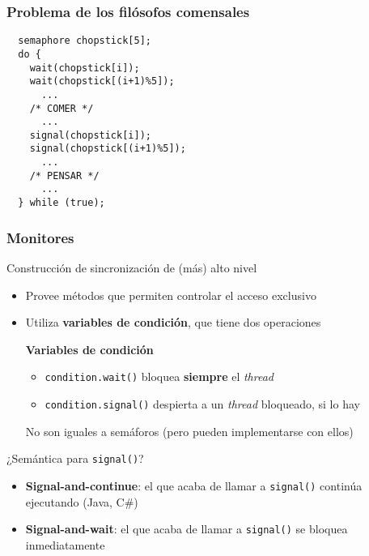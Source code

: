 \documentclass[letter]{beamer}
\begin{document}
\begin{frame}[fragile]
  \frametitle{Problema de los filósofos comensales}


\begin{verbatim}
  semaphore chopstick[5];
  do {
    wait(chopstick[i]);
    wait(chopstick[(i+1)%5]);
      ...
    /* COMER */
      ... 
    signal(chopstick[i]);
    signal(chopstick[(i+1)%5]);
      ...
    /* PENSAR */
      ...
  } while (true);
\end{verbatim}

\end{frame}

\begin{frame}
  \frametitle{Monitores}

  Construcción de sincronización de (más) alto nivel
  
  \begin{itemize}
    \item Provee métodos que permiten controlar el acceso exclusivo
    \item Utiliza {\bf variables de condición}, que tiene dos operaciones
      \begin{exampleblock}{{\bf Variables de condición}}
        \begin{itemize}
          \item {\tt condition.wait()} bloquea {\bf siempre} el {\em thread}
          \item {\tt condition.signal()} despierta a un {\em thread} bloqueado, si lo hay
        \end{itemize}
        No son iguales a semáforos (pero pueden implementarse con ellos)
      \end{exampleblock}
  \end{itemize}

  ¿Semántica para {\tt signal()}?
  \begin{itemize}
    \item {\bf Signal-and-continue}: el que acaba de llamar a {\tt signal()} continúa ejecutando (Java, C\#)
    \item {\bf Signal-and-wait}: el que acaba de llamar a {\tt signal()} se bloquea inmediatamente
  \end{itemize}
\end{frame}
\end{document}
